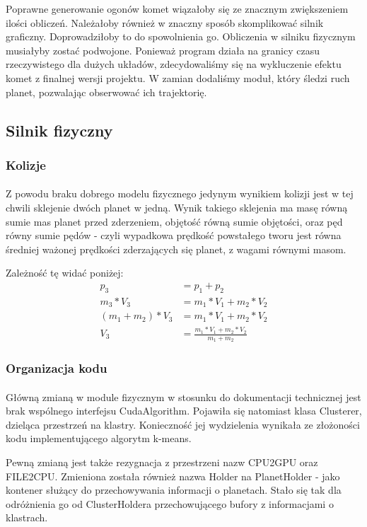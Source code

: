 Poprawne generowanie ogonów komet wiązałoby się ze znacznym zwiększeniem ilości obliczeń. Należałoby również w znaczny sposób skomplikować silnik graficzny. Doprowadziłoby to do spowolnienia go. Obliczenia w silniku fizycznym musiałyby zostać podwojone. Ponieważ program działa na granicy czasu rzeczywistego dla dużych układów, zdecydowaliśmy się na wykluczenie efektu komet z finalnej wersji projektu. W zamian dodaliśmy moduł, który śledzi ruch planet, pozwalając obserwować ich trajektorię.

\subsection{Silnik fizyczny}\label{sub:silnik fizyczny}
\subsubsection{Kolizje}
\paragraph{}

Z powodu braku dobrego modelu fizycznego jedynym wynikiem kolizji jest w tej chwili sklejenie dwóch planet w jedną. Wynik takiego sklejenia ma masę równą sumie mas planet przed zderzeniem, objętość równą sumie objętości, oraz pęd równy sumie pędów - czyli wypadkowa prędkość powstałego tworu jest równa średniej ważonej prędkości zderzających się planet, z wagami równymi masom.

Zależność tę widać poniżej:
\begin{align}
p_3 & = p_1 + p_2 \\
m_3 * V_3 & = m_1 * V_1 + m_2 * V_2 \\
( m_1 + m_2 ) * V_3 & = m_1 * V_1 + m_2 * V_2 \\
V_3 & = \frac{ m_1 * V_1 + m_2 * V_2 }{ m_1 + m_2 }
\end{align}

\subsubsection{Organizacja kodu}

\paragraph{}

Główną zmianą w module fizycznym w stosunku do dokumentacji technicznej jest brak wspólnego interfejsu CudaAlgorithm. Pojawiła się natomiast klasa Clusterer, dzieląca przestrzeń na klastry. Konieczność jej wydzielenia wynikała ze złożoności kodu implementującego algorytm k-means.

Pewną zmianą jest także rezygnacja z przestrzeni nazw CPU2GPU oraz FILE2CPU. Zmieniona została również nazwa Holder na PlanetHolder - jako kontener służący do przechowywania informacji o planetach. Stało się tak dla odróżnienia go od ClusterHoldera przechowującego bufory z informacjami o klastrach.




